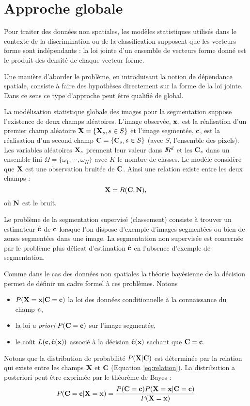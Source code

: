 \section{Approche globale}

Pour traiter des donn\'ees non spatiales, les mod\`eles statistiques utilis\'es
dans le contexte de la discrimination ou de la classification 
supposent que les vecteurs forme sont ind\'ependants : la loi
jointe d'un ensemble de vecteurs forme donn\'e est le produit
des densit\'e de chaque vecteur forme.

Une mani\`ere d'aborder le probl\`eme,
en introduisant la notion de d\'ependance spatiale, consiste \`a faire
des hypoth\`eses directement sur la forme de la loi jointe. Dans ce sens
ce type d'approche peut \^etre qualifi\'e de global. 


La mod\'elisation statistique globale des images pour la segmentation
suppose l'existence de deux champs al\'eatoires. L'image observ\'ee,
$\mbox{\bf x}$, est la r\'ealisation d'un premier champ al\'eatoire
 $\mbox{\bf X}=\{ \mbox{\bf X}_s,s \in S\}$ 
 et l'image segment\'ee, $\mbox{\bf c}$, est
la r\'ealisation d'un second champ $\mbox{\bf C}=\{ \mbox{\bf C}_s,s \in S\}$ 
(avec $S$, l'ensemble des pixels).
Les variables al\'eatoires $\mbox{\bf X}_s$ prennent leur valeur dans $I\!\!R^d$ et 
les $\mbox{\bf C}_s$ dans un ensemble fini $\Omega=\{\omega_1,\cdots,\omega_K \}$ avec $K$ le nombre
de classes. Le mod\`ele consid\`ere que $\mbox{\bf X}$ est une observation bruit\'ee de $\mbox{\bf C}$.
Ainsi une relation existe entre les deux champs :
\begin{equation}\label{eq:relation}
\mbox{\bf X}=R(\mbox{\bf C},\mbox{\bf N}),
\end{equation}
o\`u $\mbox{\bf N}$ est le bruit.

Le probl\`eme de la segmentation supervis\'e (classement) consiste \`a trouver
un estimateur $\hat{\mbox{\bf c}}$ de $\mbox{\bf c}$ lorsque l'on dispose d'exemple d'images
segment\'ees ou bien de zones segment\'ees dans une image. La segmentation non
supervis\'ee est concern\'ee par le probl\`eme plus d\'elicat d'estimation 
$\hat{\mbox{\bf c}}$ en l'absence d'exemple de segmentation. 

Comme dans le cas des donn\'ees non spatiales la th\'eorie bay\'esienne de la
d\'ecision permet de d\'efinir un cadre formel \`a ces  probl\`emes.
Notons
\begin{itemize}
\item  $P(\mbox{\bf X}=\mbox{\bf x} | \mbox{\bf C}=\mbox{\bf c})$ la loi des donn\'ees conditionnelle \`a la connaissance
du champ $\mbox{\bf c}$,
\item la loi {\em a priori} $P(\mbox{\bf C}=\mbox{\bf c})$ sur l'image segment\'ee,
\item le co\^ut $L(\mbox{\bf c},\hat{\mbox{\bf c}}(\mbox{\bf x}))$ associ\'e \`a la d\'ecision $\hat{\mbox{\bf c}}(\mbox{\bf x})$
sachant que $\mbox{\bf C}=\mbox{\bf c}$.
\end{itemize}
Notons que la distribution de probabilit\'e $P(\mbox{\bf X} | \mbox{\bf C})$ est d\'etermin\'ee
par la relation qui existe entre les champs $\mbox{\bf X}$ et $\mbox{\bf C}$ (Equation \ref{eq:relation}).
La  distribution a posteriori peut  \^etre exprim\'ee par le th\'eor\`eme de Bayes :
\[
P(\mbox{\bf C}=\mbox{\bf c} | \mbox{\bf X}=\mbox{\bf x})=\frac{P(\mbox{\bf C}=\mbox{\bf c}) P(\mbox{\bf X}=\mbox{\bf x} | \mbox{\bf C}=\mbox{\bf c}) }{P(\mbox{\bf X}=\mbox{\bf x})}
\]

